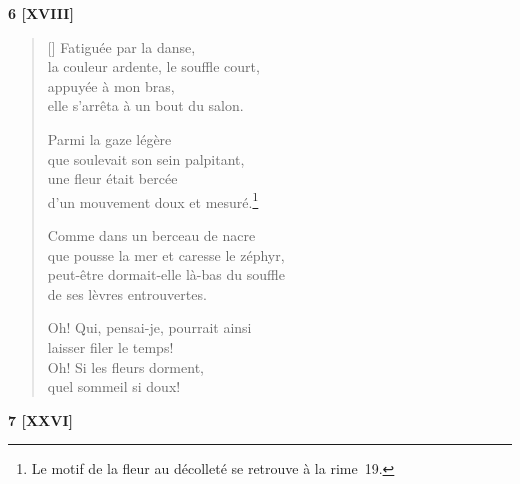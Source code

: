 \documentclass[a4paper,12pt]{book}
\begin{document}
\bigskip

\begin{center}
  \textbf{6 [XVIII]}
\end{center}

\settowidth{\versewidth}{que pousse la mer et caresse le zéphir,}

\begin{verse}[\versewidth]
  Fatiguée par la danse, \\
  la couleur ardente, le souffle court, \\
  appuyée à mon bras, \\
  elle s'arrêta à un bout du salon.

  Parmi la gaze légère \\
  que soulevait son sein palpitant, \\
  une fleur était bercée \\
  d'un mouvement doux et mesuré.\footnote{Le motif de la fleur au
  décolleté se retrouve à la rime~19.}

  Comme dans un berceau de nacre \\
  que pousse la mer et caresse le zéphyr, \\
  peut-être dormait-elle là-bas du souffle \\
  de ses lèvres entrouvertes.

  Oh! Qui, pensai-je, pourrait ainsi \\
  laisser filer le temps! \\
  Oh! Si les fleurs dorment, \\
  quel sommeil si doux!
\end{verse}

\bigskip

\begin{center}
  \textbf{7 [XXVI]}
\end{center}

\settowidth{\versewidth}{je pense comme toi qu'une ode est seule bonne}
\end{document}
